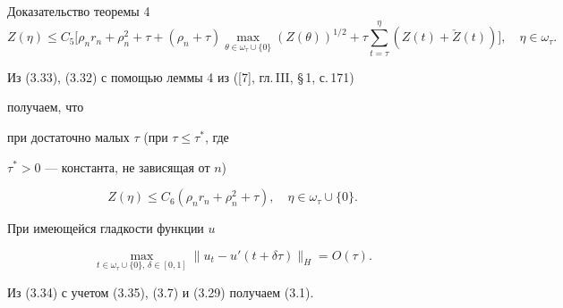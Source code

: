 \begin{pf*}{Доказательство теоремы 4}
\begin{equation}


Z(\eta)\le C_5\bigg[\rho_nr_n+\rho_n^2+\tau+


(\rho_n+\tau)\max\limits_{\theta\in\omega_{\tau}\cup\{0\}}(Z(\theta)


)^{1/2}+\tau\sum_{t=\tau}^{\eta}(Z(t)+\check Z(t))\bigg],


\quad \eta\in\omega_{\tau}.


\end{equation}


Из (3.33), (3.32) с помощью леммы 4 из ([7], гл.\,III, \S\,1, с.\,171)


получаем, что


при достаточно малых $\tau$ (при $\tau\le\tau^{\ast}$, где


$\tau^{\ast}>0$ --- константа, не зависящая от $n$)


\begin{equation}


Z(\eta)\le C_6(\rho_nr_n+\rho_n^2+\tau),


\quad \eta\in\omega_{\tau}\cup\{0\}.


\end{equation}


При имеющейся гладкости функции $u$


\begin{equation}


\max\limits_{t\in\omega_{\tau}\cup\{0\},\,\delta\in[0,1]}\|u_t-u'(t+


\delta\tau)\|_H=O(\tau).


\end{equation}


Из (3.34) с учетом (3.35), (3.7) и (3.29) получаем (3.1).


\end{pf*}






